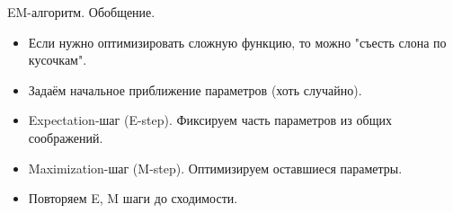\documentclass[9pt]{beamer}
\begin{document}
\begin{frame}{EM-алгоритм. Обобщение.}
    \begin{itemize}
        \item Если нужно оптимизировать сложную функцию, то можно "съесть слона по кусочкам".
        \item Задаём начальное приближение параметров (хоть случайно).
        \item Expectation-шаг (E-step). Фиксируем часть параметров из общих соображений.
        \item Maximization-шаг (M-step). Оптимизируем оставшиеся параметры. 
        \item Повторяем E, M шаги до сходимости.
    \end{itemize}
\end{frame}
\end{document}
